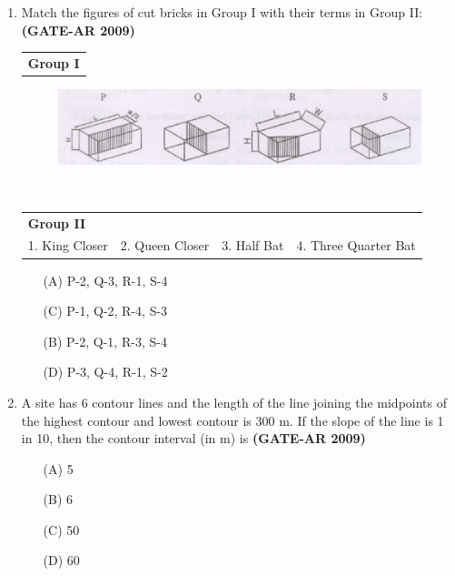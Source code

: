 \documentclass[a4paper,10pt]{article}
\begin{document}
\begin{enumerate}
    \item Match the figures of cut bricks in Group I with their terms in Group II: \hfill \textbf{(GATE-AR 2009)} \\
    \begin{tabular}{ p{\dimexpr\columnwidth-2\tabcolsep} }
	\textbf{Group I} \\
	\end{tabular}
	\begin{figure}[h!]
        \centering
        \includegraphics[width=0.5\linewidth]{figs/img_01.jpg}
        \label{fig:Img01}
	\end{figure} \\
	\begin{tabular}{ p{\dimexpr\columnwidth-2\tabcolsep} p{\dimexpr\columnwidth-2\tabcolsep} p{\dimexpr\columnwidth-2\tabcolsep} p{\dimexpr\columnwidth-2\tabcolsep} }
	\textbf{Group II} & & & \\
	1. King Closer & 2. Queen Closer & 3. Half Bat & 4. Three Quarter Bat \\
	\end{tabular}
	\begin{multicols}{2}
	\begin{itemize}
        \item[(A)] P-2, Q-3, R-1, S-4
        \item[(C)] P-1, Q-2, R-4, S-3
        \item[(B)] P-2, Q-1, R-3, S-4
        \item[(D)] P-3, Q-4, R-1, S-2
    \end{itemize}
	\end{multicols}

    \item A site has 6 contour lines and the length of the line joining the midpoints of the highest contour and lowest contour is 300 m. If the slope of the line is 1 in 10, then the contour interval (in m) is \hfill \textbf{(GATE-AR 2009)}
    \begin{multicols}{4}
	\begin{itemize}
        \item[(A)] 5
        \item[(B)] 6
        \item[(C)] 50
        \item[(D)] 60
    \end{itemize}
	\end{multicols}
	

\end{enumerate}
\end{document}
